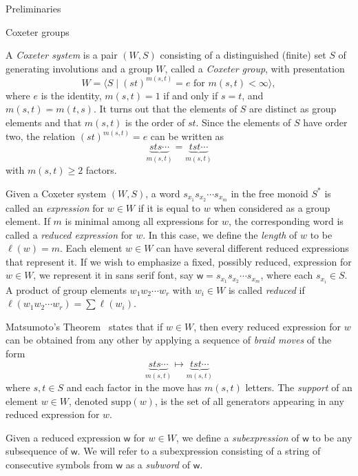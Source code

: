 \documentclass[11pt]{amsart}
\theoremstyle{definition}
\numberwithin{equation}{section}
\newcommand{\supp}{\mathrm{supp}}
\renewcommand{\(}{\left(}
\renewcommand{\)}{\right)}
\newcommand{\w}{\mathsf{w}}
\begin{document}
\begin{section}{Preliminaries}\label{sec:prelim}


\begin{subsection}{Coxeter groups}\label{subsec:coxeter groups}

A \emph{Coxeter system} is a pair $(W,S)$ consisting of a distinguished (finite) set $S$ of generating involutions and a group $W$, called a \emph{Coxeter group}, with presentation
\[
W = \langle S \mid (st)^{m(s, t)} = e \text{ for } m(s, t) < \infty \rangle,
\]
where $e$ is the identity, $m(s,t) = 1$ if and only if $s = t$, and $m(s,t) = m(t,s)$. It turns out that the elements of $S$ are distinct as group elements and that $m(s, t)$ is the order of $st$.  Since the elements of $S$ have order two, the relation $(st)^{m(s,t)} = e$ can be written as
\[
\underbrace{sts \cdots}_{m(s,t)} = \underbrace{tst \cdots}_{m(s,t)}
\]
with $m(s,t) \geq 2$ factors.

Given a Coxeter system $(W,S)$, a word $s_{x_1}s_{x_2}\cdots s_{x_m}$ in the free monoid $S^*$ is called an \emph{expression} for $w\in W$ if it is equal to $w$ when considered as a group element. If $m$ is minimal among all expressions for $w$, the corresponding word is called a \emph{reduced expression} for $w$. In this case, we define the \emph{length} of $w$ to be $\ell(w)=m$. Each element $w \in W$ can have several different reduced expressions that represent it.  If we wish to emphasize a fixed, possibly reduced, expression for $w\in W$, we represent it in \textsf{sans serif} font, say $\w=s_{x_1}s_{x_2}\cdots s_{x_m}$, where each $s_{x_i} \in S$.  A product of group elements $w_{1}w_{2}\cdots w_{r}$ with $w_{i} \in W$ is called \emph{reduced} if $\ell(w_{1}w_{2}\cdots w_{r})=\sum \ell(w_{i})$.  

Matsumoto's Theorem~\cite[Theorem 1.2.2]{Geck2000} states that if $w \in W$, then every reduced expression for $w$ can be obtained from any other by applying a sequence of \emph{braid moves} of the form 
\[
{\underbrace{sts \cdots }_{m(s,t)} } \mapsto {\underbrace{tst \cdots}_{m(s,t)}}
\]
where $s,t \in S$ and each factor in the move has $m(s,t)$ letters.  The \emph{support} of an element $w \in W$, denoted $\supp(w)$, is the set of all generators appearing in any reduced expression for $w$.

Given a reduced expression $\w$ for $w \in W$, we define a \emph{subexpression} of $\w$ to be any subsequence of $\w$. We will refer to a subexpression consisting of a string of consecutive symbols from $\w$ as a \emph{subword} of $\w$.


\end{subsection}
\end{section}
\end{document}
